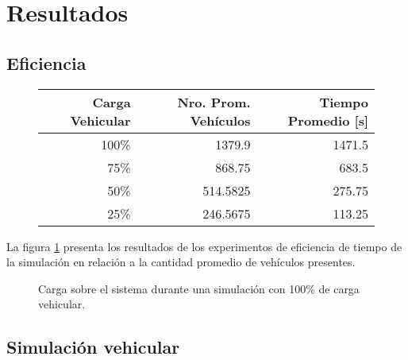 \section{Resultados}
\subsection{Eficiencia}

\begin{figure}[htpb]
    \centering
    \begin{tabular}{@{}rrr@{}}
        \textbf{Carga Vehicular} & \textbf{Nro. Prom. Vehículos} & \textbf{Tiempo Promedio [s]} \\ \midrule
        100\%           & 1379.9          & 1471.5              \\ %
        75\%            & 868.75          & 683.5               \\ %
        50\%            & 514.5825        & 275.75              \\ %
        25\%            & 246.5675        & 113.25              \\ \bottomrule
    \end{tabular}
    \label{table:vehiclesvstime}


    
    \label{fig:vehiclesvstime}
\end{figure}

La figura \ref{fig:vehiclesvstime} presenta los resultados de los experimentos de eficiencia de tiempo de la simulación en relación a la cantidad promedio de vehículos presentes.

\begin{figure}[htpb]
    \centering
    
    \caption{Carga sobre el sistema durante una simulación con 100\% de carga vehicular.}
    \label{fig:systemload}
\end{figure}

\subsection{Simulación vehicular}